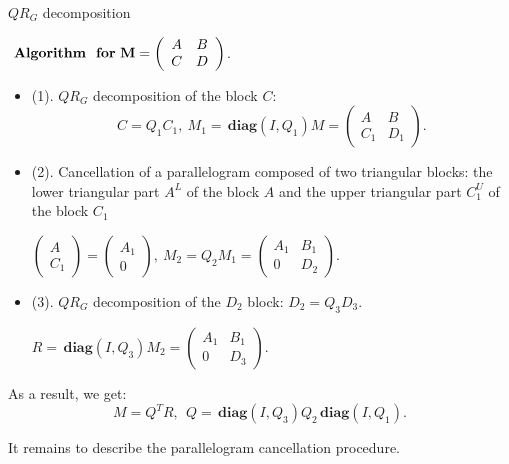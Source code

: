 \documentclass[pdf]{beamer}
\begin{document}
\begin{frame}{ $ QR_G $ decomposition}
  
 $\bf\textbf{  Algorithm }  \ for \ M = \left (\begin {array} {cc} A & B \\ C & D \end {array} \right) $. 
 
\begin{itemize} 
\item
  (1).  $ QR_G $ decomposition of the block  
  $C$:  
  $$C=Q_{1}C_{1},\ M_{1}=\, \mathbf{diag}(I,Q_{1}) M= \left(\begin{array}{cc}A & B \\ C_{1} & D_{1} \end{array}\right).$$
 \item
 (2). Cancellation of a parallelogram composed of two triangular blocks: the lower triangular part $ A ^ L $ of the block $ A $ and the upper triangular part  $ C ^ U_ {1} $ of the block $ C_ {1} $ 
 
 
 $ \left(\begin{array}{c}A \\ C_{1} \end{array}\right) = \left(\begin{array}{c}A_{1} \\ 0 \end{array}\right),\   M_{2}= Q_{2} M_{1}= \left(\begin{array}{cc}A_{1} & B_{1} \\ 0 & D_{2} \end{array}\right).$
 
\item
 (3).   $ QR_G $ decomposition of the $ D_ {2} $ block:
   $D_{2}=Q_{3}D_{3}$.  
   
   $R=\, \mathbf{diag}(I,Q_{3}) M_{2}= 
   \left(\begin{array}{cc}A_{1} & B_{1} \\ 0 & D_{3} \end{array}\right). $
\end{itemize}
 As a result, we get:
 $$M=Q^T R, \ \ Q=\, \mathbf{diag}(I,Q_{3}) Q_{2} \, \mathbf{diag}(I,Q_{1}). $$
 
 It remains to describe the parallelogram cancellation procedure.


\end{frame}
\end{document}
